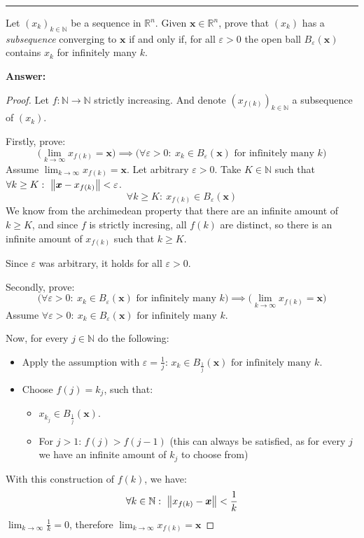 \documentclass[11pt]{article}
\renewcommand{\vec}[1]{\bm{#1}} %
\newcounter{problem}
\newenvironment{problem}{%
    \newpage
    \refstepcounter{problem}%
    \Needspace{7\baselineskip}%
    \par\vspace{0.7em}%
    \noindent\textcolor{courseblue}{\rule{\textwidth}{0.4pt}}%
    \par\vspace{0.5em}%
    \begin{list}{}{%
        \setlength{\leftmargin}{2.3em}%
        \setlength{\labelwidth}{1.8em}%
        \setlength{\labelsep}{0.5em}%
        \setlength{\topsep}{0pt}%
        \setlength{\partopsep}{0pt}%
    }%
    \item[{[\theproblem]}]
}{%
    \end{list}
    \par\vspace{0.5em}
}
\newenvironment{answer}{%
    \Needspace{4\baselineskip}%
    \par\vspace{0.35em}
    \noindent\textbf{Answer:}\par
}{%
    \par\vspace{0.25em}
}
\begin{document}
\begin{problem}
Let $(x_k)_{k\in\mathbb{N}}$ be a sequence in $\mathbb{R}^n$. Given $\vec{x}\in\mathbb{R}^n$, prove that $(x_k)$ has a \emph{subsequence} converging to $\vec{x}$ if and only if, for all $\varepsilon > 0$ the open ball $B_\varepsilon(\vec{x})$ contains $x_k$ for infinitely many $k$.
\begin{answer}
    \begin{proof} Let $f:\mathbb{N}\to\mathbb{N}$ strictly increasing. And denote $(x_{f(k)})_{k\in\mathbb{N}}$ a subsequence of $(x_k)$.

        Firstly, prove:
        \[\Big(\lim_{k\to\infty}x_{f(k)} = \vec{x}\Big) \implies
        \Big(\forall \varepsilon > 0:\ x_k\in B_\varepsilon(\vec{x})\text{ for infinitely many } k \Big)
        \]
        Assume $\lim_{k\to\infty}x_{f(k)} = \vec{x}$.
        Let arbitrary $\varepsilon > 0$. Take $K\in\mathbb{N}$ such that $\forall k \geq K:\ \norm{\vec{x} - x_{f(k)}} < \varepsilon$.
        \[\forall k\geq K:\ x_{f(k)}\in B_\varepsilon(\vec{x})\]
        We know from the archimedean property that there are an infinite amount of $k\geq K$, and since $f$ is strictly incresing, all $f(k)$ are distinct, so there is an infinite amount of $x_{f(k)}$ such that $k\geq K$.

        Since $\varepsilon$ was arbitrary, it holds for all $\varepsilon > 0$.

        Secondly, prove:
        \[\Big(\forall \varepsilon > 0:\ x_k\in B_\varepsilon(\vec{x})\text{ for infinitely many } k \Big)
        \implies \big(\lim_{k\to\infty}x_{f(k)} = \vec{x}\big)\]
        Assume $\forall \varepsilon > 0:\ x_k\in B_\varepsilon(\vec{x})\text{ for infinitely many } k$.
        
        Now, for every $j\in\mathbb{N}$ do the following:
        \begin{itemize}
            \item Apply the assumption with $\varepsilon = \frac{1}{j}$: $x_k\in B_\frac{1}{j}(\vec{x})\text{ for infinitely many } k$.
            \item Choose $f(j) = k_j$, such that:
            \begin{itemize}
                \item $x_{k_j}\in B_\frac{1}{j}(\vec{x})$.
                \item For $j > 1$: $f(j) > f(j-1)$ (this can always be satisfied, as for every $j$ we have an infinite amount of $k_j$ to choose from)
            \end{itemize}
        \end{itemize}
        With this construction of $f(k)$, we have:
        \[\forall k\in\mathbb{N}:\ \norm{x_{f(k)}-\vec{x}} < \frac{1}{k}\] 
        $\lim_{k\to\infty}\frac{1}{k} = 0$, therefore $\lim_{k\to\infty}x_{f(k)} = \vec{x}$
    \end{proof}
\end{answer}
\end{problem}
\end{document}
